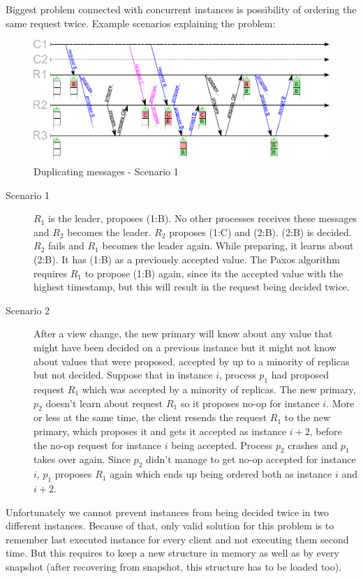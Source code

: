 Biggest problem connected with concurrent instances is possibility of ordering the same request twice. Example scenarios explaining the problem:
\begin{figure}[ht]
  \includegraphics[keepaspectratio, width=\textwidth]{paxos/duplicating_messages.pdf}
  \caption{Duplicating messages - Scenario 1}
\end{figure}
\begin{description}
  \item [Scenario 1] $R_1$ is the leader, proposes (1:B). No other processes receives these messages and $R_2$ becomes the leader. $R_2$ proposes (1:C) and (2:B). (2:B) is decided. $R_2$ fails and $R_1$ becomes the leader again. While preparing, it learns about (2:B). It has (1:B) as a previously accepted value. The Paxos algorithm requires $R_1$ to propose (1:B) again, since its the accepted value with the highest timestamp, but this will result in the request being decided twice.

  \item [Scenario 2] After a view change, the new primary will know about any value that might have been decided on a previous instance but it might not know about values that were proposed, accepted by up to a minority of replicas but not decided. Suppose that in instance $i$, process $p_1$ had proposed request $R_1$ which was accepted by a minority of replicas. The new primary, $p_2$ doesn't learn about request $R_1$ so it proposes no-op for instance $i$. More or less at the same time, the client resends the request $R_1$ to the new primary, which proposes it and gets it accepted as instance $i+2$, before the no-op request for instance $i$ being accepted. Process $p_2$ crashes and $p_1$ takes over again. Since $p_2$ didn't manage to get no-op accepted for instance $i$, $p_1$ proposes $R_1$ again which ends up being ordered both as instance $i$ and $i+2$.
\end{description} 

Unfortunately we cannot prevent instances from being decided twice in two different instances. Because of that, only valid solution for this problem is to remember last executed instance for every client and not executing them second time. But this requires to keep a new structure in memory as well as by every snapshot (after recovering from snapshot, this structure has to be loaded too).

